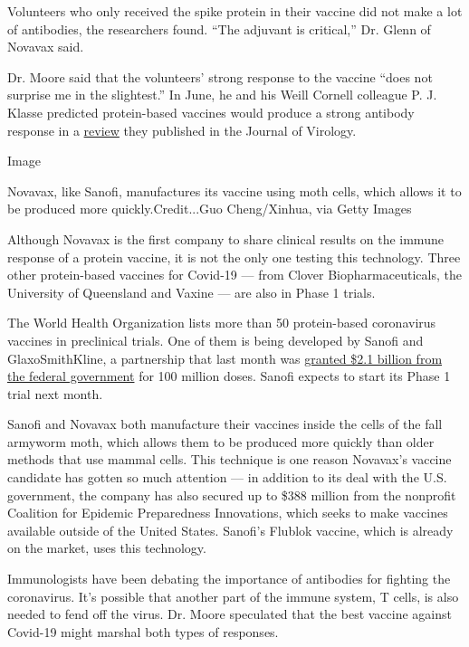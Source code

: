 Volunteers who only received the spike protein in their vaccine did not
make a lot of antibodies, the researchers found. ``The adjuvant is
critical,'' Dr. Glenn of Novavax said.

Dr. Moore said that the volunteers' strong response to the vaccine
``does not surprise me in the slightest.'' In June, he and his Weill
Cornell colleague P. J. Klasse predicted protein-based vaccines would
produce a strong antibody response in a
\href{https://jvi.asm.org/content/early/2020/06/26/JVI.01083-20}{review}
they published in the Journal of Virology.

Image

Novavax, like Sanofi, manufactures its vaccine using moth cells, which
allows it to be produced more quickly.Credit...Guo Cheng/Xinhua, via
Getty Images

Although Novavax is the first company to share clinical results on the
immune response of a protein vaccine, it is not the only one testing
this technology. Three other protein-based vaccines for Covid-19 ---
from Clover Biopharmaceuticals, the University of Queensland and Vaxine
--- are also in Phase 1 trials.

The World Health Organization lists more than 50 protein-based
coronavirus vaccines in preclinical trials. One of them is being
developed by Sanofi and GlaxoSmithKline, a partnership that last month
was
\href{https://www.nytimes.com/2020/07/31/health/covid-19-vaccine-sanofi-gsk.html}{granted
\$2.1 billion from the federal government} for 100 million doses. Sanofi
expects to start its Phase 1 trial next month.

Sanofi and Novavax both manufacture their vaccines inside the cells of
the fall armyworm moth, which allows them to be produced more quickly
than older methods that use mammal cells. This technique is one reason
Novavax's vaccine candidate has gotten so much attention --- in addition
to its deal with the U.S. government, the company has also secured up to
\$388 million from the nonprofit Coalition for Epidemic Preparedness
Innovations, which seeks to make vaccines available outside of the
United States. Sanofi's Flublok vaccine, which is already on the market,
uses this technology.

Immunologists have been debating the importance of antibodies for
fighting the coronavirus. It's possible that another part of the immune
system, T cells, is also needed to fend off the virus. Dr. Moore
speculated that the best vaccine against Covid-19 might marshal both
types of responses.

